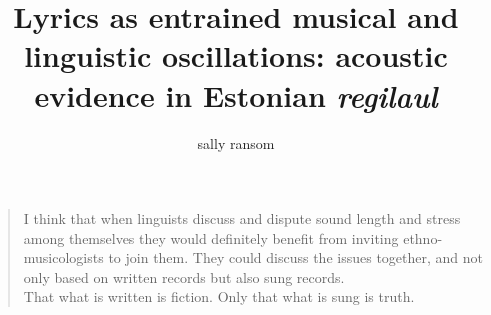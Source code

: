 \documentclass[12pt]{report}	%
\author{sally ransom}  	%
\title{Lyrics as entrained musical and linguistic oscillations: acoustic evidence in Estonian {\it regilaul}}
\theoremstyle{plain} %
\theoremstyle{definition}
\theoremstyle{remark}
\numberwithin{equation}{section}
\begin{document}


%
%

\titlepage              %
%





%
\begin{dedication}
%

\begin{quotation}
{\scriptsize I think that when linguists discuss and dispute sound length and stress among themselves they would definitely benefit from inviting ethno-musicologists to join them. They could discuss the issues together, and not only based on written records but also sung records. \\ 
That what is written is fiction. Only that what is sung is truth. \\
\cite{tormis2007} }



\end{quotation}

\end{dedication}




%
\utabstract
{}%
\indent
%
%
\end{document}

